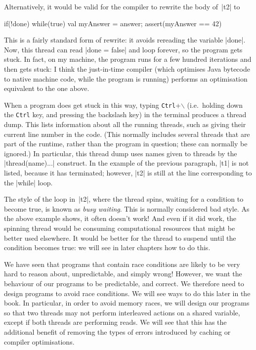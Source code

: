 Alternatively, it would be valid for the compiler to rewrite the body of~|t2|
to
% 
\begin{mysamepage}
\begin{scala}
  if(!done){ while(true){ } }
  val myAnswer = answer; assert(myAnswer == 42)
\end{scala}
\end{mysamepage}
This is a fairly standard form of rewrite: it avoids rereading the variable
|done|.  Now, this thread can read |done = false| and loop forever, so the
program gets stuck.  In fact, on my machine, the program runs for a few
hundred iterations and then gets stuck: I think the just-in-time compiler
(which optimises Java bytecode to native machine code, while the program is
running) performs an optimisation equivalent to the one above.

When a program does get stuck in this way, typing \texttt{Ctrl}+$\backslash$
(i.e.~holding down the \texttt{Ctrl} key, and pressing the backslash key) in
the terminal produces a thread dump.  This lists information about all the
running threads, such as giving their current line number in the code.  (This
normally includes several threads that are part of the runtime, rather than
the program in question; these can normally be ignored.)  In particular, this
thread dump uses names given to threads by the |thread(name){...}| construct.
In the example of the previous paragraph, |t1| is not listed, because it has
terminated; however, |t2| is still at the line corresponding to the |while|
loop.

The style of the loop in~|t2|, where the thread spins, waiting for a condition
to become true, is known as \emph{busy waiting}.  This is normally considered
bad style.  As the above example shows, it often doesn't work!  And even if it
did work, the spinning thread would be consuming computational resources that
might be better used elsewhere.  It would be better for the thread to suspend
until the condition becomes true: we will see in later chapters how to do
this.  

We have seen that programs that contain race conditions are likely to be very
hard to reason about, unpredictable, and simply wrong!  However, we want the
behaviour of our programs to be predictable, and correct.  We therefore need
to design programs to avoid race conditions.  We will see ways to do this
later in the book.  In particular, in order to avoid memory races, we will
design our programs so that two threads may not perform interleaved actions on
a shared variable, except if both threads are performing reads.  We will see
that this has the additional benefit of removing the types of errors
introduced by caching or compiler optimisations.

